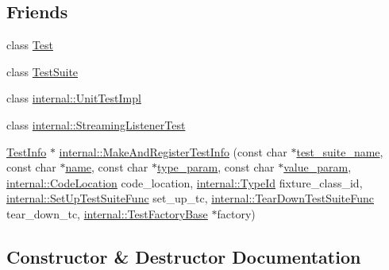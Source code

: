 \subsection*{Friends}
\begin{DoxyCompactItemize}
\item 
class \hyperlink{classtesting_1_1TestInfo_a5b78b1c2e1fa07ffed92da365593eaa4}{Test}
\item 
class \hyperlink{classtesting_1_1TestInfo_ab9aaba231fd11196425e75caf709bfc6}{Test\+Suite}
\item 
class \hyperlink{classtesting_1_1TestInfo_acc0a5e7573fd6ae7ad1878613bb86853}{internal\+::\+Unit\+Test\+Impl}
\item 
class \hyperlink{classtesting_1_1TestInfo_adc037d188dab349a94868991955c9cd4}{internal\+::\+Streaming\+Listener\+Test}
\item 
\hyperlink{classtesting_1_1TestInfo}{Test\+Info} $\ast$ \hyperlink{classtesting_1_1TestInfo_a63d61c7ffd0423b1d3615f0ff5f2040e}{internal\+::\+Make\+And\+Register\+Test\+Info} (const char $\ast$\hyperlink{classtesting_1_1TestInfo_a82a84ffd0e4d18eb5a3f97a2077e12cc}{test\+\_\+suite\+\_\+name}, const char $\ast$\hyperlink{classtesting_1_1TestInfo_ac2581b45eccc9a3b94cb41c4807d0e34}{name}, const char $\ast$\hyperlink{classtesting_1_1TestInfo_a7759bc57f4350ad406cbbb0b3bcea320}{type\+\_\+param}, const char $\ast$\hyperlink{classtesting_1_1TestInfo_abdf2c6cfcf4819e725816c64e1c1fc24}{value\+\_\+param}, \hyperlink{structtesting_1_1internal_1_1CodeLocation}{internal\+::\+Code\+Location} code\+\_\+location, \hyperlink{namespacetesting_1_1internal_ab1114197d3c657d8b7f8e0c5caa12d00}{internal\+::\+Type\+Id} fixture\+\_\+class\+\_\+id, \hyperlink{namespacetesting_1_1internal_a83e4e0732ac6a9dcfe6ee299dc1b9fa2}{internal\+::\+Set\+Up\+Test\+Suite\+Func} set\+\_\+up\+\_\+tc, \hyperlink{namespacetesting_1_1internal_a8257a87aa42cebaa54b0c48a6ae657a5}{internal\+::\+Tear\+Down\+Test\+Suite\+Func} tear\+\_\+down\+\_\+tc, \hyperlink{classtesting_1_1internal_1_1TestFactoryBase}{internal\+::\+Test\+Factory\+Base} $\ast$factory)
\end{DoxyCompactItemize}


\subsection{Constructor \& Destructor Documentation}
\mbox{\label{classtesting_1_1TestInfo_a8d382c1b1b511f0d9112c14684809852}} 

